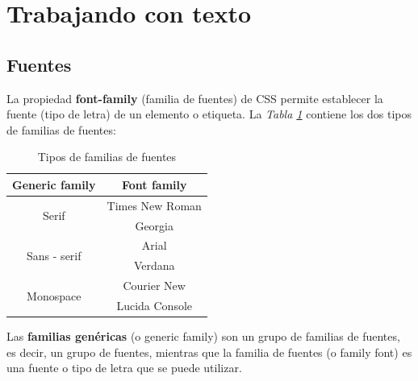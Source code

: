 \section{Trabajando con texto}


\subsection{Fuentes}

La propiedad \textbf{font-family} (familia de fuentes) de CSS permite establecer la fuente (tipo de letra) de un elemento o etiqueta. La \textit{Tabla \ref{tab: 1}} contiene los dos tipos de familias de fuentes:
\begin{table}[H]
    \centering
    \caption{Tipos de familias de fuentes}
    \label{tab: 1}
    \begin{tabular}{c c}
        \hline
        \textbf{Generic family} & \textbf{Font family} \\
        \hline
        \multirow{2}{5cm}{Serif}                & Times New Roman \\
        & Georgia \\
        \multirow{2}{5cm}{Sans - serif}  & Arial \\
        & Verdana \\
        \multirow{2}{5cm}{Monospace}     & Courier New \\
        & Lucida Console \\
        \hline
    \end{tabular}
\end{table}

Las \textbf{familias genéricas} (o generic family) son un grupo de familias de fuentes, es decir, un grupo de fuentes, mientras que la familia de fuentes (o family font) es una fuente o tipo de letra que se puede utilizar.

